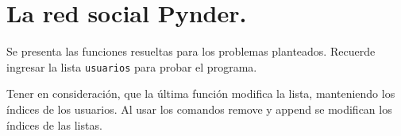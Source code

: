 \section{La red social Pynder.}

  Se presenta las funciones resueltas para los problemas planteados. Recuerde ingresar la lista \texttt{usuarios} para probar el programa.
  
  
    
Tener en consideración, que la última función modifica la lista, manteniendo los índices de los usuarios. Al usar los comandos remove y append se modifican los índices de las listas.
    
